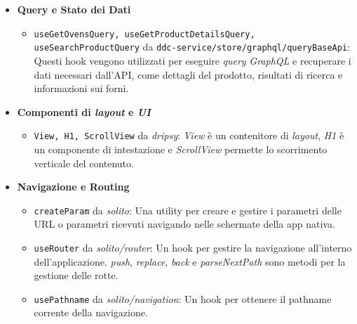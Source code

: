 \begin{itemize}
    \item \textbf{Query e Stato dei Dati}
    \begin{itemize}
        \item \texttt{useGetOvensQuery, useGetProductDetailsQuery, useSearchProductQuery} da \texttt{ddc-service/store/graphql/queryBaseApi}: Questi hook vengono utilizzati per eseguire \textit{query} \textit{GraphQL} e recuperare i dati necessari dall'API, 
        come dettagli del prodotto, risultati di ricerca e informazioni sui forni.
    \end{itemize}

    \item \textbf{Componenti di \textit{layout} e \textit{UI}}
    \begin{itemize}
        \item \texttt{View, H1, ScrollView} da \textit{dripsy}: \textit{View} è un contenitore di \textit{layout}, \textit{H1} è un componente di intestazione e \textit{ScrollView} permette lo scorrimento verticale del contenuto.
    \end{itemize}

    \item \textbf{Navigazione e Routing}
    \begin{itemize}
        \item \texttt{createParam} da \textit{solito}: Una utility per creare e gestire i parametri delle URL o parametri ricevuti navigando nelle schermate della app nativa.
        \item \texttt{useRouter} da \textit{solito/router}: Un hook per gestire la navigazione all'interno dell'applicazione. \textit{push}, \textit{replace}, \textit{back} e \textit{parseNextPath} sono metodi per la gestione delle rotte.
        \item \texttt{usePathname} da \textit{solito/navigation}: Un hook per ottenere il pathname corrente della navigazione.
    \end{itemize}


\end{itemize}
